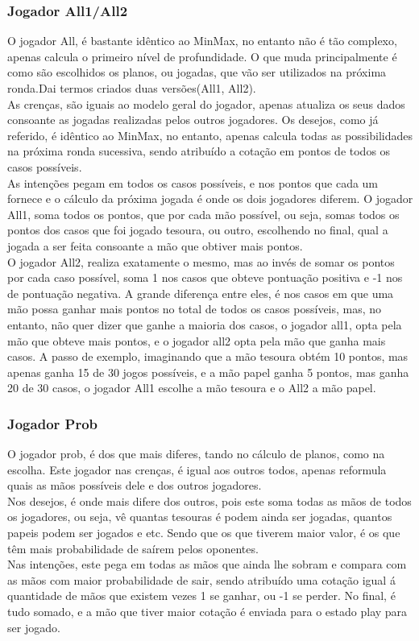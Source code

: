 \documentclass[12pt]{article}
\begin{document}
	\subsubsection*{Jogador All1/All2}
	O jogador All, é bastante idêntico ao MinMax, no entanto não é tão complexo, apenas calcula o primeiro nível de profundidade. O que muda principalmente é como são escolhidos os planos, ou jogadas, que vão ser utilizados na próxima ronda.Dai termos criados duas versões(All1, All2).\\
    As crenças, são iguais ao modelo geral do jogador, apenas atualiza os seus dados consoante as jogadas realizadas pelos outros jogadores.
    Os desejos, como já referido, é idêntico ao MinMax, no entanto, apenas calcula todas as possibilidades na próxima ronda sucessiva, sendo atribuído a cotação em pontos de todos os casos possíveis.\\
    As intenções pegam em todos os casos possíveis, e nos pontos que cada um fornece e o cálculo da próxima jogada é onde os dois jogadores diferem.
    O jogador All1, soma todos os pontos, que por cada mão possível, ou seja, somas todos os pontos dos casos que foi jogado tesoura, ou outro, escolhendo no final, qual a jogada a ser feita consoante a mão que obtiver mais pontos.\\
    O jogador All2, realiza exatamente o mesmo, mas ao invés de somar os pontos por cada caso possível, soma 1 nos casos que obteve pontuação positiva e -1 nos de pontuação negativa.
    A grande diferença entre eles, é nos casos em que uma mão possa ganhar mais pontos no total de todos os casos possíveis, mas, no entanto, não quer dizer que ganhe a maioria dos casos, o jogador all1, opta pela mão que obteve mais pontos, e o jogador all2 opta pela mão que ganha mais casos. A passo de exemplo, imaginando que a mão tesoura obtém 10 pontos, mas apenas ganha 15 de 30 jogos possíveis, e a mão papel ganha 5 pontos, mas ganha 20 de 30 casos, o jogador All1 escolhe a mão tesoura e o All2 a mão papel.\\

	
	\subsubsection*{Jogador Prob}
	O jogador prob, é dos que mais diferes, tando no cálculo de planos, como na escolha.
    Este jogador nas crenças, é igual aos outros todos, apenas reformula quais as mãos possíveis dele e dos outros jogadores.\\
    Nos desejos, é onde mais difere dos outros, pois este soma todas as mãos de todos os jogadores, ou seja, vê quantas tesouras é podem ainda ser jogadas, quantos papeis podem ser jogados e etc. Sendo que os que tiverem maior valor, é os que têm mais probabilidade de saírem pelos oponentes.\\
    Nas intenções, este pega em todas as mãos que ainda lhe sobram e compara com as mãos com maior probabilidade de sair, sendo atribuído uma cotação igual á quantidade de mãos que existem vezes 1 se ganhar, ou -1 se perder. No final, é tudo somado, e a mão que tiver maior cotação é enviada para o estado play para ser jogado.
\end{document}
